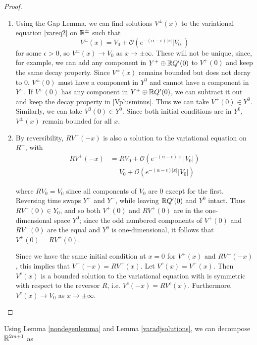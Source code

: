 \documentclass[thesis.tex]{subfiles}
\begin{document}
\begin{lemma}
\begin{proof}
\begin{enumerate}
\item Using the Gap Lemma, we can find solutions $V^\pm(x)$ to the variational equation \eqref{vareq2} on ${\mathbb R}^\pm$ such that
\begin{equation}\label{Vplusminus}
V^\pm(x) = V_0 + \mathcal{O}(e^{-(\alpha - \epsilon)|x|}|V_0|)
\end{equation}
for some $\epsilon > 0$, so $V^\pm(x) \rightarrow V_0$ as $x \rightarrow \pm \infty$. These will not be unique, since, for example, we can add any component in $Y^+ \oplus {\mathbb R} Q'(0)$ to $V^+(0)$ and keep the same decay property. Since $V^\pm(x)$ remains bounded but does not decay to 0, $V^\pm(0)$ must have a component in $Y^0$ and cannot have a component in $Y^-$. If $V^+(0)$ has any component in $Y^+ \oplus {\mathbb R} Q'(0)$, we can subtract it out and keep the decay property in \eqref{Vplusminus}. Thus we can take $V^+(0) \in Y^0$. Similarly, we can take $V^0(0) \in Y^0$. Since both initial conditions are in $Y^0$, $V^\pm(x)$ remain bounded for all $x$.

\item By reversibility, $RV^+(-x)$ is also a solution to the variational equation on $R^-$, with 
\begin{align*}
R V^+(-x) &= R V_0 + \mathcal{O}(e^{-(\alpha - \epsilon)|x|}|V_0|) \\
&= V_0 + \mathcal{O}(e^{-(\alpha - \epsilon)|x|}|V_0|)
\end{align*}

where $R V_0 = V_0$ since all components of $V_0$ are 0 except for the first. Reversing time swaps $Y^+$ and $Y^-$, while leaving ${\mathbb R} Q'(0)$ and $Y^0$ intact. Thus 
$RV^+(0) \in Y_0$, and so both $V^+(0)$ and $RV^+(0)$ are in the one-dimensional space $Y^0$; since the odd numbered components of $V^+(0)$ and $RV^+(0)$ are the equal and $Y^0$ is one-dimensional, it follows that $V^+(0) = RV^+(0)$.

Since we have the same initial condition at $x = 0$ for $V^+(x)$ and $RV^+(-x)$, this implies that $V^+(-x) = RV^+(x)$. Let $V^c(x) = V^+(x)$. Then $V^c(x)$ is a bounded solution to the variational equation with is symmetric with respect to the reversor $R$, i.e. $V^c(-x) = RV^c(x)$. Furthermore, $V^c(x) \rightarrow V_0$ as $x \rightarrow \pm \infty$.

\end{enumerate}
\end{proof}
\end{lemma}

Using Lemma \ref{nondegenlemma} and Lemma \ref{varadjsolutions}, we can decompose ${\mathbb R}^{2m+1}$ as  
\end{document}
